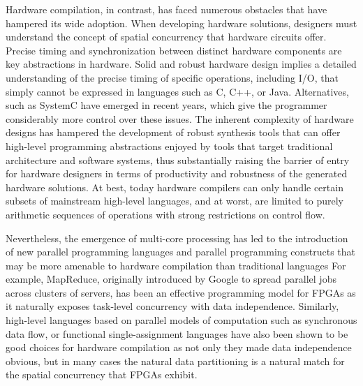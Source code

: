 Hardware compilation, in contrast, has faced numerous obstacles that have hampered its wide adoption. When developing hardware solutions, designers must understand the concept of spatial concurrency that hardware circuits offer. 
Precise timing and synchronization between distinct hardware components are key abstractions in hardware. 
Solid and robust hardware design implies a detailed understanding of the precise timing of specific operations, including I/O, that simply cannot be expressed in languages such as C, C++, or Java. Alternatives, such as SystemC have emerged in recent years, which give the programmer considerably more control over these issues. 
The inherent complexity of hardware designs has hampered the development of robust synthesis tools that can offer high-level programming abstractions enjoyed by tools that target traditional architecture and software systems, thus substantially raising the barrier of entry for hardware designers in terms of productivity and robustness of the generated hardware solutions. 
At best, today hardware compilers can only handle certain subsets of mainstream high-level languages, and at worst, are limited to purely arithmetic sequences of operations with strong restrictions on control flow.

Nevertheless, the emergence of multi-core processing has led to the introduction of new parallel programming languages and parallel programming constructs that may be more amenable to hardware compilation than traditional languages 
% 
% 
For example, MapReduce, originally introduced by Google to spread parallel jobs across clusters of servers, has been an effective programming model for FPGAs as it naturally exposes task-level concurrency with data independence. Similarly, high-level languages based on parallel models of computation such as synchronous data flow, or functional single-assignment languages have also been shown to be good choices for hardware compilation as not only they made data independence obvious, but in many cases the natural data partitioning is a natural match for the spatial concurrency that FPGAs exhibit.

